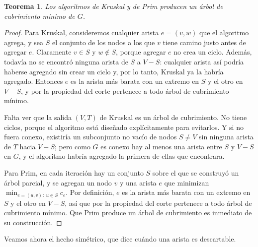 \documentclass[12pt, spanish, oneside, openany]{book}
\theoremstyle{uprightplain}
\newtheorem{teorema}{Teorema}[section]
\theoremstyle{definition}
\theoremstyle{remark}
\theoremstyle{definition}
\begin{document}
\begin{teorema}
\label{teo:kruskal-prim-optimos}
Los algoritmos de Kruskal y de Prim producen un árbol de cubrimiento mínimo de $G$.
\end{teorema}
\begin{proof}
Para Kruskal, consideremos cualquier arista $e=(v,w)$ que el algoritmo agrega, y sea $S$ el conjunto de los nodos a los que $v$ tiene camino justo antes de agregar $e$. Claramente $v \in S$ y $w \notin S$, porque agregar $e$ no crea un ciclo. Además, todavía no se encontró ninguna arista de $S$ a $V-S$: cualquier arista así podría haberse agregado sin crear un ciclo y, por lo tanto, Kruskal ya la habría agregado. Entonces $e$ es la arista más barata con un extremo en $S$ y el otro en $V-S$, y por la propiedad del corte pertenece a todo árbol de cubrimiento mínimo.

Falta ver que la salida $(V,T)$ de Kruskal es un árbol de cubrimiento. No tiene ciclos, porque el algoritmo está diseñado explícitamente para evitarlos. Y si no fuera conexo, existiría un subconjunto no vacío de nodos $S \neq V$ sin ninguna arista de $T$ hacia $V-S$; pero como $G$ es conexo hay al menos una arista entre $S$ y $V-S$ en $G$, y el algoritmo habría agregado la primera de ellas que encontrara.

Para Prim, en cada iteración hay un conjunto $S$ sobre el que se construyó un árbol parcial, y se agregan un nodo $v$ y una arista $e$ que minimizan $\min_{e=(u,v)\,:\,u\in S} c_e$. Por definición, $e$ es la arista más barata con un extremo en $S$ y el otro en $V-S$, así que por la propiedad del corte pertenece a todo árbol de cubrimiento mínimo. Que Prim produce un árbol de cubrimiento es inmediato de su construcción.
\end{proof}

Veamos ahora el hecho simétrico, que dice cuándo una arista es descartable.
\end{document}
